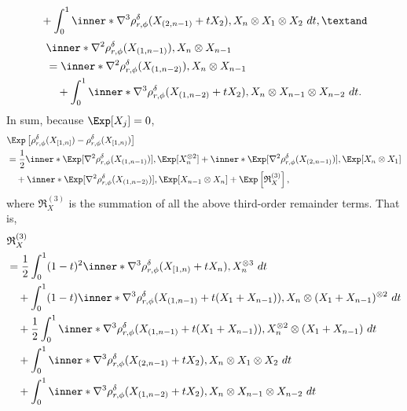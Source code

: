 \documentclass[aos]{imsart}
\begin{document}
\begin{appendix}
\begin{equation*}
\begin{aligned}
    & \quad + \int_0^1 
    \inner*{ \nabla^3 \rho_{r,\phi}^\delta(X_{(2,n-1)} + t X_2),
    X_n \otimes X_1 \otimes X_2} ~dt, \textand
\end{aligned}
\end{equation*}
\begin{equation*}
\begin{aligned}
    & \inner*{\nabla^2 \rho_{r,\phi}^\delta(X_{(1,n-1)}), X_n \otimes X_{n-1}} \\
    & = \inner*{\nabla^2 \rho_{r,\phi}^\delta(X_{(1,n-2)}), X_n \otimes X_{n-1}} \\
    & \quad + \int_0^1 
    \inner*{ \nabla^3 \rho_{r,\phi}^\delta(X_{(1,n-2)} + t X_2),
    X_n \otimes X_{n-1} \otimes X_{n-2}} ~dt.
\end{aligned}
\end{equation*}
In sum, because $\Exp[X_j] = 0$,
\begin{equation*}
\begin{aligned}
    & \Exp\left[ \rho_{r,\phi}^{\delta}(X_{[1,n]}) - \rho_{r,\phi}^\delta(X_{[1,n)}) \right] \\
    & = \frac{1}{2} \inner*{
        \Exp[\nabla^2 \rho_{r,\phi}^\delta(X_{(1,n-1)})], 
        \Exp[X_n^{\otimes 2}]
    }
    + \inner*{
        \Exp[\nabla^2 \rho_{r,\phi}^\delta(X_{(2,n-1)})], 
        \Exp[X_n \otimes X_1]
    } \\
    & \quad + \inner*{
        \Exp[\nabla^2 \rho_{r,\phi}^\delta(X_{(1,n-2)})], 
        \Exp[X_{n-1} \otimes X_n]
    } 
    + \Exp\left[ \mathfrak{R}_X^{(3)} \right],
\end{aligned}
\end{equation*}
where $\mathfrak{R}_X^{(3)}$ is the summation of all the above third-order remainder terms. That is,
\begin{equation*}
\begin{aligned}
    & \mathfrak{R}_X^{(3)} \\
    & = \frac{1}{2} \int_0^1 (1-t)^2 \inner*{
    \nabla^3 \rho_{r,\phi}^\delta(X_{[1,n)} + t X_n), X_n^{\otimes 3}} ~dt \\
    & \quad + \int_0^1 (1-t) 
    \inner*{ \nabla^3 \rho_{r,\phi}^\delta(X_{(1,n-1)} + t (X_1 + X_{n-1})),
    X_n \otimes (X_1 + X_{n-1})^{\otimes 2}} ~dt \\
    & \quad + \frac{1}{2} \int_0^1 
    \inner*{ \nabla^3 \rho_{r,\phi}^\delta(X_{(1,n-1)} + t (X_1 + X_{n-1})),
    X_n^{\otimes 2} \otimes (X_1 + X_{n-1})} ~dt \\
    & \quad + \int_0^1 
    \inner*{ \nabla^3 \rho_{r,\phi}^\delta(X_{(2,n-1)} + t X_2),
    X_n \otimes X_1 \otimes X_2} ~dt \\
    & \quad + \int_0^1 
    \inner*{ \nabla^3 \rho_{r,\phi}^\delta(X_{(1,n-2)} + t X_2),
    X_n \otimes X_{n-1} \otimes X_{n-2}} ~dt    
\end{aligned}
\end{equation*}


\end{appendix}
\end{document}
